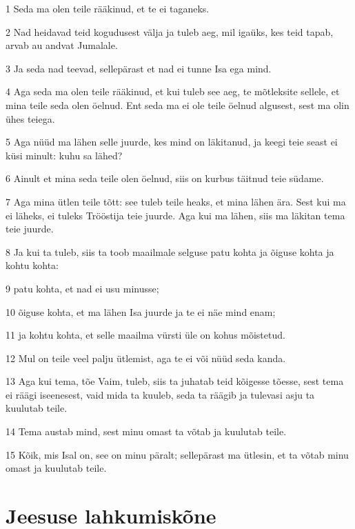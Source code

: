 \par 1 Seda ma olen teile rääkinud, et te ei taganeks.
\par 2 Nad heidavad teid kogudusest välja ja tuleb aeg, mil igaüks, kes teid tapab, arvab au andvat Jumalale.
\par 3 Ja seda nad teevad, sellepärast et nad ei tunne Isa ega mind.
\par 4 Aga seda ma olen teile rääkinud, et kui tuleb see aeg, te mõtleksite sellele, et mina teile seda olen öelnud. Ent seda ma ei ole teile öelnud algusest, sest ma olin ühes teiega.
\par 5 Aga nüüd ma lähen selle juurde, kes mind on läkitanud, ja keegi teie seast ei küsi minult: kuhu sa lähed?
\par 6 Ainult et mina seda teile olen öelnud, siis on kurbus täitnud teie südame.
\par 7 Aga mina ütlen teile tõtt: see tuleb teile heaks, et mina lähen ära. Sest kui ma ei läheks, ei tuleks Trööstija teie juurde. Aga kui ma lähen, siis ma läkitan tema teie juurde.
\par 8 Ja kui ta tuleb, siis ta toob maailmale selguse patu kohta ja õiguse kohta ja kohtu kohta:
\par 9 patu kohta, et nad ei usu minusse;
\par 10 õiguse kohta, et ma lähen Isa juurde ja te ei näe mind enam;
\par 11 ja kohtu kohta, et selle maailma vürsti üle on kohus mõistetud.
\par 12 Mul on teile veel palju ütlemist, aga te ei või nüüd seda kanda.
\par 13 Aga kui tema, tõe Vaim, tuleb, siis ta juhatab teid kõigesse tõesse, sest tema ei räägi iseenesest, vaid mida ta kuuleb, seda ta räägib ja tulevasi asju ta kuulutab teile.
\par 14 Tema austab mind, sest minu omast ta võtab ja kuulutab teile.
\par 15 Kõik, mis Isal on, see on minu päralt; sellepärast ma ütlesin, et ta võtab minu omast ja kuulutab teile.

\section*{Jeesuse lahkumiskõne}

